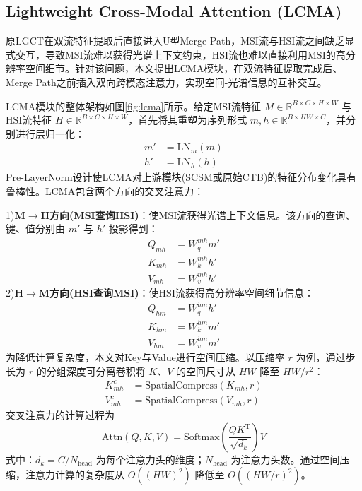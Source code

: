 \documentclass[UTF8,a4paper,11pt]{ctexart}
\begin{document}
\subsection{Lightweight Cross-Modal Attention (LCMA)}
原LGCT在双流特征提取后直接进入U型Merge Path，MSI流与HSI流之间缺乏显式交互，导致MSI流难以获得光谱上下文约束，HSI流也难以直接利用MSI的高分辨率空间细节。针对该问题，本文提出LCMA模块，在双流特征提取完成后、Merge Path之前插入双向跨模态注意力，实现空间-光谱信息的互补交互。

LCMA模块的整体架构如图\ref{fig:lcma}所示。给定MSI流特征 $M \in \mathbb{R}^{B \times C \times H \times W}$ 与HSI流特征 $H \in \mathbb{R}^{B \times C \times H \times W}$，首先将其重塑为序列形式 $m, h \in \mathbb{R}^{B \times HW \times C}$，并分别进行层归一化：
\begin{equation}
\begin{aligned}
m' &= \mathrm{LN}_m(m) \\
h' &= \mathrm{LN}_h(h)
\end{aligned}
\label{eq:lcma_ln}
\end{equation}
Pre-LayerNorm设计使LCMA对上游模块(SCSM或原始CTB)的特征分布变化具有鲁棒性。LCMA包含两个方向的交叉注意力：

1)\textbf{M$\rightarrow$H方向(MSI查询HSI)}：使MSI流获得光谱上下文信息。该方向的查询、键、值分别由 $m'$ 与 $h'$ 投影得到：
\begin{equation}
\begin{aligned}
Q_{mh} &= W_q^{mh} m' \\
K_{mh} &= W_k^{mh} h' \\
V_{mh} &= W_v^{mh} h'
\end{aligned}
\label{eq:lcma_qkv_mh}
\end{equation}
2)\textbf{H$\rightarrow$M方向(HSI查询MSI)}：使HSI流获得高分辨率空间细节信息：
\begin{equation}
\begin{aligned}
Q_{hm} &= W_q^{hm} h' \\
K_{hm} &= W_k^{hm} m' \\
V_{hm} &= W_v^{hm} m'
\end{aligned}
\label{eq:lcma_qkv_hm}
\end{equation}
为降低计算复杂度，本文对Key与Value进行空间压缩。以压缩率 $r$ 为例，通过步长为 $r$ 的分组深度可分离卷积将 $K$、$V$ 的空间尺寸从 $HW$ 降至 $HW/r^2$：
\begin{equation}
\begin{aligned}
K_{mh}^{c} &= \mathrm{SpatialCompress}(K_{mh}, r) \\
V_{mh}^{c} &= \mathrm{SpatialCompress}(V_{mh}, r)
\end{aligned}
\label{eq:lcma_compress}
\end{equation}
交叉注意力的计算过程为
\begin{equation}
  \mathrm{Attn}(Q, K, V) = \mathrm{Softmax}\!\left(\frac{Q K^{\mathrm{T}}}{\sqrt{d_k}}\right) V
  \label{eq:lcma_attn}
\end{equation}
式中：$d_k = C / N_{\mathrm{head}}$ 为每个注意力头的维度；$N_{\mathrm{head}}$ 为注意力头数。通过空间压缩，注意力计算的复杂度从 $O((HW)^2)$ 降低至 $O((HW/r)^2)$。
\end{document}
